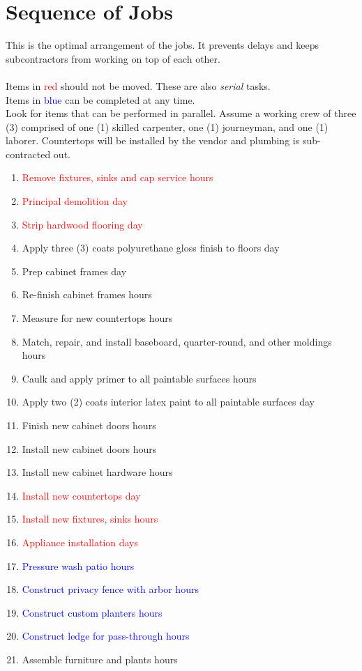 \documentclass[letterpaper,10pt]{article}
\begin{document}
\section*{Sequence of Jobs}
This is the optimal arrangement of the jobs.  It prevents delays and keeps subcontractors from working on top of each other.\\
\\
Items in \textcolor{red}{red} should not be moved.  These are also \emph{serial} tasks.\\
Items in \textcolor{blue}{blue} can be completed at any time.\\
Look for items that can be performed in parallel.  Assume a working crew of three (3) comprised of one (1) skilled carpenter, one (1) journeyman, and one (1) laborer.  Countertops will be installed by the vendor and plumbing is sub-contracted out.
\begin{enumerate}
\item\textcolor{red}{Remove fixtures, sinks and cap service hours}
\item \textcolor{red}{Principal demolition day}
\item \textcolor{red}{Strip hardwood flooring day}
\item Apply three (3) coats polyurethane gloss finish to floors day
\item Prep cabinet frames day
\item Re-finish cabinet frames hours
\item Measure for new countertops hours
\item Match, repair, and install baseboard, quarter-round, and other moldings hours
\item Caulk and apply primer to all paintable surfaces hours
\item Apply two (2) coats interior latex paint to all paintable surfaces day
\item Finish new cabinet doors hours
\item Install new cabinet doors hours
\item Install new cabinet hardware hours
\item \textcolor{red}{Install new countertops day}
\item \textcolor{red}{Install new fixtures, sinks hours}
\item \textcolor{red}{Appliance installation days}
\item \textcolor{blue}{Pressure wash patio hours}
\item \textcolor{blue}{Construct privacy fence with arbor hours}
\item \textcolor{blue}{Construct custom planters hours}
\item \textcolor{blue}{Construct ledge for pass-through hours}
\item Assemble furniture and plants hours
\end{enumerate}
\end{document}

